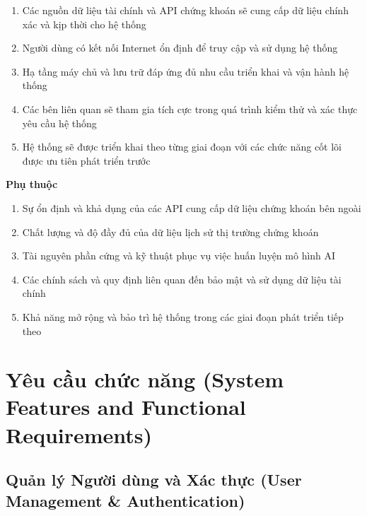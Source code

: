 \documentclass[12pt, a4paper]{article}
\begin{document}
\begin{enumerate}
    \renewcommand{\labelenumi}{\arabic{enumi})}

    \item Các nguồn dữ liệu tài chính và API chứng khoán sẽ cung cấp dữ liệu chính xác và kịp thời cho hệ thống
    \item Người dùng có kết nối Internet ổn định để truy cập và sử dụng hệ thống
    \item Hạ tầng máy chủ và lưu trữ đáp ứng đủ nhu cầu triển khai và vận hành hệ thống
    \item Các bên liên quan sẽ tham gia tích cực trong quá trình kiểm thử và xác thực yêu cầu hệ thống
    \item Hệ thống sẽ được triển khai theo từng giai đoạn với các chức năng cốt lõi được ưu tiên phát triển trước
\end{enumerate}

\noindent\textbf{Phụ thuộc}

\begin{enumerate}
    \renewcommand{\labelenumi}{\arabic{enumi})}

    \item Sự ổn định và khả dụng của các API cung cấp dữ liệu chứng khoán bên ngoài
    \item Chất lượng và độ đầy đủ của dữ liệu lịch sử thị trường chứng khoán
    \item Tài nguyên phần cứng và kỹ thuật phục vụ việc huấn luyện mô hình AI
    \item Các chính sách và quy định liên quan đến bảo mật và sử dụng dữ liệu tài chính
    \item Khả năng mở rộng và bảo trì hệ thống trong các giai đoạn phát triển tiếp theo
\end{enumerate}

\section{Yêu cầu chức năng (System Features and Functional Requirements)}
\subsection{Quản lý Người dùng và Xác thực (User Management \& Authentication)}
\end{document}
